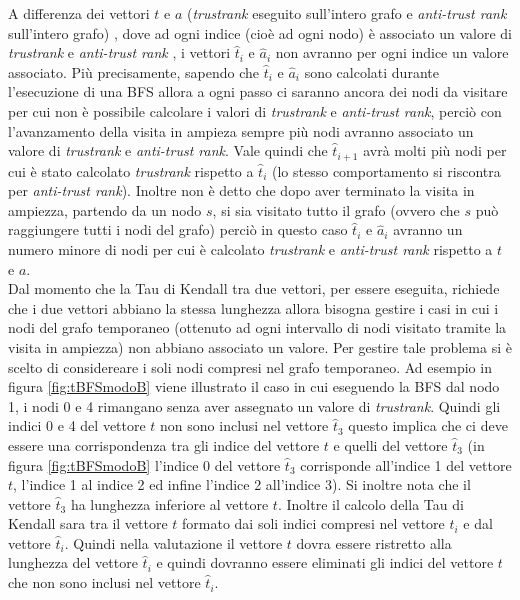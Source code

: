 A differenza dei vettori \(t\) e \(a\) (\textit{trustrank} eseguito sull'intero grafo e \textit{anti-trust rank} sull'intero grafo) , dove ad ogni indice (cioè ad ogni nodo) è associato un valore di \textit{trustrank} e \textit{anti-trust rank} , i vettori \(\hat{t}_i\) e \(\hat{a}_i\) non avranno per ogni indice un valore associato. Più precisamente, sapendo che \(\hat{t}_i\) e \(\hat{a}_i\) sono calcolati durante l'esecuzione di una BFS allora a ogni passo ci saranno ancora dei nodi da visitare per cui non è possibile calcolare i valori di \textit{trustrank} e \textit{anti-trust rank}, perciò con l'avanzamento della visita in ampieza sempre più nodi avranno associato un valore di \textit{trustrank} e \textit{anti-trust rank}. Vale quindi che \(\hat{t}_{i+1}\) avrà molti più nodi per cui è stato calcolato \textit{trustrank} rispetto a \(\hat{t}_i\) (lo stesso comportamento si riscontra per \textit{anti-trust rank}). Inoltre non è detto che dopo aver terminato la visita in ampiezza, partendo da un nodo \(s\),
 si sia visitato tutto il grafo (ovvero che \(s\) può raggiungere tutti i nodi del grafo) perciò in questo caso \(\hat{t}_i\) e \(\hat{a}_i\) avranno un numero minore di nodi per cui è calcolato \textit{trustrank} e \textit{anti-trust rank} rispetto a \(t\) e \(a\).\\
Dal momento che la Tau di Kendall tra due vettori, per essere eseguita, richiede che i due vettori abbiano la stessa lunghezza allora bisogna gestire i casi in cui i nodi del grafo temporaneo (ottenuto ad ogni intervallo di nodi visitato tramite la visita in ampiezza) non abbiano associato un valore. Per gestire tale problema si è scelto di considereare i soli nodi compresi nel grafo temporaneo. Ad esempio in figura \ref{fig:tBFSmodoB} viene illustrato il caso in cui eseguendo la BFS dal nodo 1, i nodi 0 e 4 rimangano senza aver assegnato un valore di \textit{trustrank}. Quindi gli indici 0 e 4 del vettore \(t\) non sono inclusi nel vettore \(\hat{t}_3\) questo implica che ci deve essere una corrispondenza tra gli indice del vettore \(t\) e quelli del vettore \(\hat{t}_3\) (in figura \ref{fig:tBFSmodoB} l'indice 0 del vettore \(\hat{t}_3\) corrisponde all'indice 1 del vettore \(t\), l'indice 1 al indice 2 ed infine l'indice 2 all'indice 3).  Si inoltre nota che il vettore \(\hat{t}_3\) ha lunghezza inferiore 
al vettore \(t\). Inoltre il calcolo della Tau di Kendall sara tra il vettore \(t\) formato dai soli indici compresi nel vettore \(\hat{t}_i\) e dal vettore \(\hat{t}_i\). Quindi  nella valutazione  il vettore \(t\) dovra essere ristretto alla lunghezza del vettore \(\hat{t}_i\) e quindi dovranno essere eliminati gli indici del vettore \(t\) che non sono inclusi nel vettore \(\hat{t}_i\).
